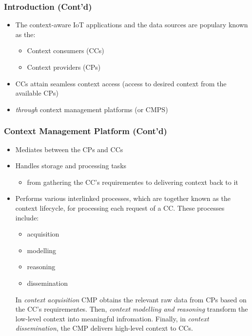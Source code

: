 \documentclass{../iot-lecture}
\begin{document}
\begin{frame}
  \frametitle{Introduction  (Cont'd)}
  \begin{itemize}
    \item The context-aware IoT applications and the data sources are populary known as the:
    \begin{itemize}
      \item Context consumers (CCs)
      \item Context providers (CPs)
    \end{itemize}
    \item CCs attain seamless context access (access to desired context from the available CPs)
    \item \textit{\color{YellowOrange} through} context management platforms (or CMPS)
  \end{itemize}
\end{frame}

\begin{frame}
  \frametitle{Context Management Platform  (Cont'd)}
  \begin{itemize}
    \item Mediates between the CPs and CCs
    \item Handles storage and processing tasks
    \begin{itemize}
      \item from gathering the CC's requirementes to delivering context back to it
    \end{itemize}
    \item Performs various interlinked processes, which are together known as the context lifecycle, for processing each request of a CC. These processes include:
    \begin{itemize}
      \item acquisition
      \item modelling
      \item reasoning
      \item dissemination
    \end{itemize}
    \begin{block}{}
      In \textit{context acquisition} CMP obtains the relevant raw data from CPs based on the CC's requirementes.
      Then, \textit{context modelling and reasoning} transform the low-level context into meaningful infromation.
      Finally, in \textit{context dissemination}, the CMP delivers high-level context to CCs.
    \end{block}
  \end{itemize}
\end{frame}
\end{document}
